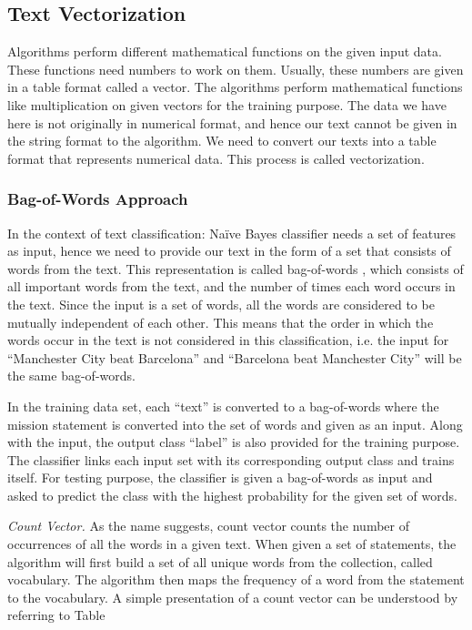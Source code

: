 \documentclass[12pt]{article}
\begin{document}
\subsection{Text Vectorization}
Algorithms perform different mathematical functions on the given input data. These functions need numbers to work on them. Usually, these numbers are given in a table format called a vector. The algorithms perform mathematical functions like multiplication on given vectors for the training purpose. The data we have here is not originally in numerical format, and hence our text cannot be given in the string format to the algorithm. We need to convert our texts into a table format that represents numerical data. This process is called vectorization. 

\subsubsection{Bag-of-Words Approach}

In the context of text classification: Na\"ive Bayes classifier needs a set of features as input, hence we need to provide our text in the form of a set that consists of words from the text. This representation is called bag-of-words \parencites{Jurafsky:2009:SLP:1214993}, which consists of all important words from the text, and the number of times each word occurs in the text. Since the input is a set of words, all the words are considered to be mutually independent of each other. This means that the order in which the words occur in the text is not considered in this classification, i.e. the input for ``Manchester City beat Barcelona'' and ``Barcelona beat Manchester City'' will be the same bag-of-words.

In the training data set, each ``text'' is converted to a bag-of-words where the mission statement is converted into the set of words and given as an input. Along with the input, the output class ``label'' is also provided for the training purpose. The classifier links each input set with its corresponding output class and trains itself. For testing purpose, the classifier is given a bag-of-words as input and asked to predict the class with the highest probability for the given set of words.

\textit{Count Vector.} 
As the name suggests, count vector counts the number of occurrences of all the words in a given text. When given a set of statements, the algorithm will first build a set of all unique words from the collection, called vocabulary. The algorithm then maps the frequency of a word from the statement to the vocabulary. A simple presentation of a count vector can be understood by referring to Table 
\end{document}
